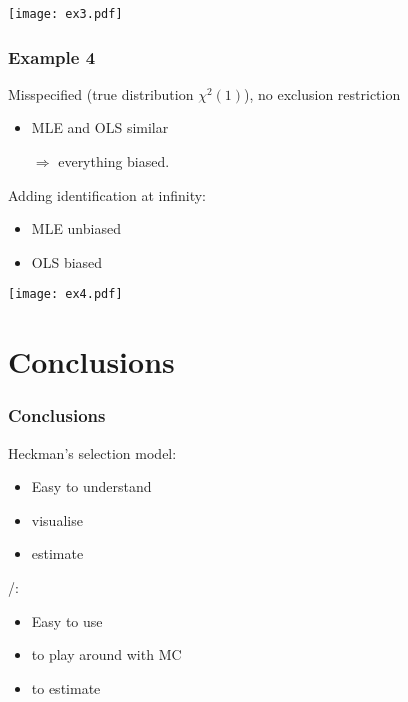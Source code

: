 \documentclass{beamer}
\begin{document}
\begin{frame}
  \texttt{[image: ex3.pdf]}
\end{frame}

\begin{frame}
  \frametitle{Example 4}
  
  Misspecified (true distribution $\chi^2(1)$), no exclusion restriction
  \begin{itemize}
  \item MLE and OLS similar
  \item[$\Rightarrow$] everything biased.
  \end{itemize}

  \pause
  Adding identification at infinity:
  \begin{itemize}
  \item MLE unbiased
  \item OLS biased
  \end{itemize}
\end{frame}

\begin{frame}
  \texttt{[image: ex4.pdf]}
\end{frame}



\section{Conclusions}

\begin{frame}
  \frametitle{Conclusions}
  
  Heckman's selection model:
  \begin{itemize}
  \item Easy to understand
  \item \qquad visualise
  \item \qquad estimate
  \end{itemize}

  \pause
  /:
  \begin{itemize}
  \item Easy to use
  \item to play around with MC
  \item to estimate
  \end{itemize}
\end{frame}
\end{document}

